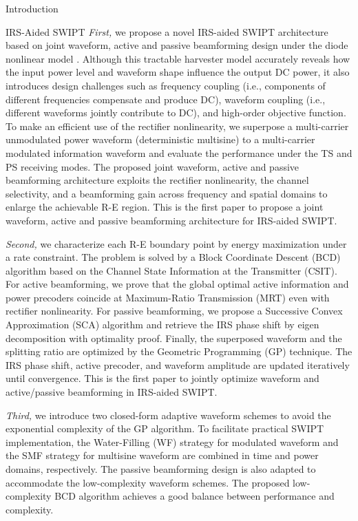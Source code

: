 \documentclass[journal]{IEEEtran}
\begin{document}
\begin{section}{Introduction}
\begin{subsection}{IRS-Aided SWIPT}
			\emph{First,} we propose a novel IRS-aided SWIPT architecture based on joint waveform, active and passive beamforming design under the diode nonlinear model \cite{Clerckx2016a}. Although this tractable harvester model accurately reveals how the input power level and waveform shape influence the output DC power, it also introduces design challenges such as frequency coupling (i.e., components of different frequencies compensate and produce DC), waveform coupling (i.e., different waveforms jointly contribute to DC), and high-order objective function. To make an efficient use of the rectifier nonlinearity, we superpose a multi-carrier unmodulated power waveform (deterministic multisine) to a multi-carrier modulated information waveform and evaluate the performance under the TS and PS receiving modes. The proposed joint waveform, active and passive beamforming architecture exploits the rectifier nonlinearity, the channel selectivity, and a beamforming gain across frequency and spatial domains to enlarge the achievable R-E region. This is the first paper to propose a joint waveform, active and passive beamforming architecture for IRS-aided SWIPT.

			\emph{Second,} we characterize each R-E boundary point by energy maximization under a rate constraint. The problem is solved by a Block Coordinate Descent (BCD) algorithm based on the Channel State Information at the Transmitter (CSIT). For active beamforming, we prove that the global optimal active information and power precoders coincide at Maximum-Ratio Transmission (MRT) even with rectifier nonlinearity. For passive beamforming, we propose a Successive Convex Approximation (SCA) algorithm and retrieve the IRS phase shift by eigen decomposition with optimality proof. Finally, the superposed waveform and the splitting ratio are optimized by the Geometric Programming (GP) technique. The IRS phase shift, active precoder, and waveform amplitude are updated iteratively until convergence. This is the first paper to jointly optimize waveform and active/passive beamforming in IRS-aided SWIPT.

			\emph{Third,} we introduce two closed-form adaptive waveform schemes to avoid the exponential complexity of the GP algorithm. To facilitate practical SWIPT implementation, the Water-Filling (WF) strategy for modulated waveform and the SMF strategy for multisine waveform are combined in time and power domains, respectively. The passive beamforming design is also adapted to accommodate the low-complexity waveform schemes. The proposed low-complexity BCD algorithm achieves a good balance between performance and complexity.


\end{subsection}
\end{section}
\end{document}
